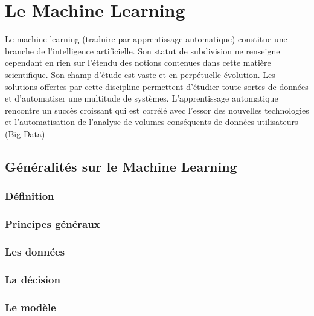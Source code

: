 \chapter{ Le  Machine Learning}
\label{Le Machine Learning}
\thispagestyle{fancy}
Le machine learning (traduire par apprentissage automatique) constitue une branche de l'intelligence artificielle. Son statut de subdivision ne renseigne cependant en rien sur l'étendu des notions contenues dans cette matière scientifique. Son champ d'étude est vaste et en perpétuelle évolution. Les solutions offertes par cette discipline permettent d'étudier toute sortes de données et d'automatiser une multitude de systèmes. L'apprentissage automatique rencontre un succès croissant qui est corrélé avec l'essor des nouvelles technologies et l'automatisation de l'analyse de volumes conséquents de données utilisateurs (Big Data)

\section{Généralités sur le Machine Learning}
\label{Le Machine Learning: Généralités sur le Machine Learning}

\subsection{Définition}
\label{Le Machine Learning: Les différents algorithmes: Définition}

\subsection{Principes généraux}
\label{Le Machine Learning: Les différents algorithmes: Principes généraux}

\subsection{Les données}
\label{Le Machine Learning: Les différents algorithmes: Les données}

\subsection{La décision}
\label{Le Machine Learning: Les différents algorithmes: La décision}

\subsection{Le modèle}
\label{Le Machine Learning: Les différents algorithmes: Le modèle}


